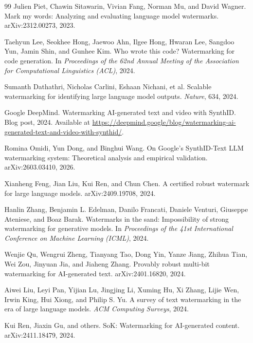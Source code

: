 \documentclass[11pt]{article}
\theoremstyle{definition}
\newcommand{\1}{\mathbf{1}}
\begin{document}
\begin{thebibliography}{99}
Julien Piet, Chawin Sitawarin, Vivian Fang, Norman Mu, and David Wagner.
\newblock Mark my words: Analyzing and evaluating language model watermarks.
\newblock arXiv:2312.00273, 2023.

Taehyun Lee, Seokhee Hong, Jaewoo Ahn, Ilgee Hong, Hwaran Lee, Sangdoo Yun, Jamin Shin, and Gunhee Kim.
\newblock Who wrote this code? Watermarking for code generation.
\newblock In \emph{Proceedings of the 62nd Annual Meeting of the Association for Computational Linguistics (ACL)}, 2024.

Sumanth Dathathri, Nicholas Carlini, Eshaan Nichani, et al.
\newblock Scalable watermarking for identifying large language model outputs.
\newblock \emph{Nature}, 634, 2024.

Google DeepMind.
\newblock Watermarking AI-generated text and video with SynthID.
\newblock Blog post, 2024. Available at \url{https://deepmind.google/blog/watermarking-ai-generated-text-and-video-with-synthid/}.

Romina Omidi, Yun Dong, and Binghui Wang.
\newblock On Google's SynthID-Text LLM watermarking system: Theoretical analysis and empirical validation.
\newblock arXiv:2603.03410, 2026.

Xianheng Feng, Jian Liu, Kui Ren, and Chun Chen.
\newblock A certified robust watermark for large language models.
\newblock arXiv:2409.19708, 2024.

Hanlin Zhang, Benjamin L. Edelman, Danilo Francati, Daniele Venturi, Giuseppe Ateniese, and Boaz Barak.
\newblock Watermarks in the sand: Impossibility of strong watermarking for generative models.
\newblock In \emph{Proceedings of the 41st International Conference on Machine Learning (ICML)}, 2024.

Wenjie Qu, Wengrui Zheng, Tianyang Tao, Dong Yin, Yanze Jiang, Zhihua Tian, Wei Zou, Jinyuan Jia, and Jiaheng Zhang.
\newblock Provably robust multi-bit watermarking for AI-generated text.
\newblock arXiv:2401.16820, 2024.

Aiwei Liu, Leyi Pan, Yijian Lu, Jingjing Li, Xuming Hu, Xi Zhang, Lijie Wen, Irwin King, Hui Xiong, and Philip S. Yu.
\newblock A survey of text watermarking in the era of large language models.
\newblock \emph{ACM Computing Surveys}, 2024.

Kui Ren, Jiaxin Gu, and others.
\newblock SoK: Watermarking for AI-generated content.
\newblock arXiv:2411.18479, 2024.


\end{thebibliography}
\end{document}
